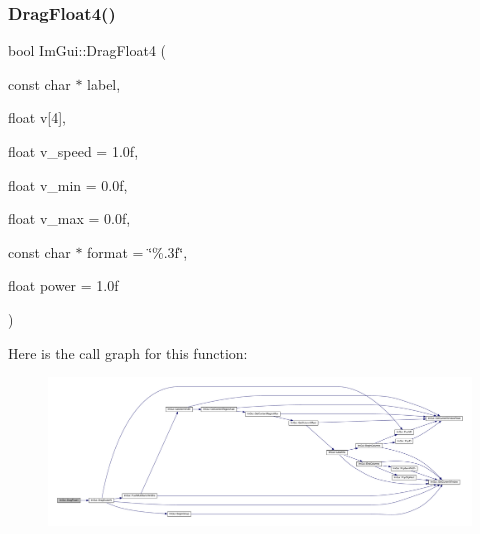 \subsubsection{\texorpdfstring{Drag\+Float4()}{DragFloat4()}}
{\footnotesize\ttfamily bool Im\+Gui\+::\+Drag\+Float4 (\begin{DoxyParamCaption}\item[{const char $\ast$}]{label,  }\item[{float}]{v\mbox{[}4\mbox{]},  }\item[{float}]{v\+\_\+speed = {\ttfamily 1.0f},  }\item[{float}]{v\+\_\+min = {\ttfamily 0.0f},  }\item[{float}]{v\+\_\+max = {\ttfamily 0.0f},  }\item[{const char $\ast$}]{format = {\ttfamily \char`\"{}\%.3f\char`\"{}},  }\item[{float}]{power = {\ttfamily 1.0f} }\end{DoxyParamCaption})}

Here is the call graph for this function\+:
\nopagebreak
\begin{figure}[H]
\begin{center}
\leavevmode
\includegraphics[width=350pt]{namespace_im_gui_a091e461705a8f49156f44e08ba29ced1_cgraph}
\end{center}
\end{figure}
\mbox{\label{namespace_im_gui_a6f27fa140df683e09943411c959a1f2b}} 
